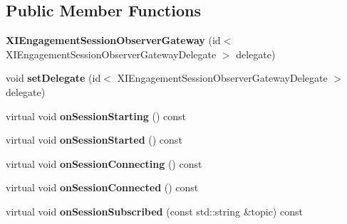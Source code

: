 \subsection*{Public Member Functions}
\begin{DoxyCompactItemize}
\item 
\hypertarget{class_x_i_engagement_session_observer_gateway_a1b8d83fdac4a57b104bc544689f801ff}{}\label{class_x_i_engagement_session_observer_gateway_a1b8d83fdac4a57b104bc544689f801ff} 
{\bfseries X\+I\+Engagement\+Session\+Observer\+Gateway} (id$<$ X\+I\+Engagement\+Session\+Observer\+Gateway\+Delegate $>$ delegate)
\item 
\hypertarget{class_x_i_engagement_session_observer_gateway_a292cf4e67ac5a04c0c4d1b56824aeb8f}{}\label{class_x_i_engagement_session_observer_gateway_a292cf4e67ac5a04c0c4d1b56824aeb8f} 
void {\bfseries set\+Delegate} (id$<$ X\+I\+Engagement\+Session\+Observer\+Gateway\+Delegate $>$ delegate)
\item 
\hypertarget{class_x_i_engagement_session_observer_gateway_a7adb16b509db1caa45c3049fe948e5b1}{}\label{class_x_i_engagement_session_observer_gateway_a7adb16b509db1caa45c3049fe948e5b1} 
virtual void {\bfseries on\+Session\+Starting} () const
\item 
\hypertarget{class_x_i_engagement_session_observer_gateway_a817a89b6330ba1ed5bcb3a73a229dd15}{}\label{class_x_i_engagement_session_observer_gateway_a817a89b6330ba1ed5bcb3a73a229dd15} 
virtual void {\bfseries on\+Session\+Started} () const
\item 
\hypertarget{class_x_i_engagement_session_observer_gateway_a882b1968632416ca26a399aed2e434c2}{}\label{class_x_i_engagement_session_observer_gateway_a882b1968632416ca26a399aed2e434c2} 
virtual void {\bfseries on\+Session\+Connecting} () const
\item 
\hypertarget{class_x_i_engagement_session_observer_gateway_a47f44c9723208759b9ea07752937aa98}{}\label{class_x_i_engagement_session_observer_gateway_a47f44c9723208759b9ea07752937aa98} 
virtual void {\bfseries on\+Session\+Connected} () const
\item 
\hypertarget{class_x_i_engagement_session_observer_gateway_ab06cb96c12702f7b1a162c5b4e35cda9}{}\label{class_x_i_engagement_session_observer_gateway_ab06cb96c12702f7b1a162c5b4e35cda9} 
virtual void {\bfseries on\+Session\+Subscribed} (const std\+::string \&topic) const
\item 
\hypertarget{class_x_i_engagement_session_observer_gateway_a4feaf428ce0d9e1bf3101072c9031fe5}{}\label{class_x_i_engagement_session_observer_gateway_a4feaf428ce0d9e1bf3101072c9031fe5} 

\end{DoxyCompactItemize}
